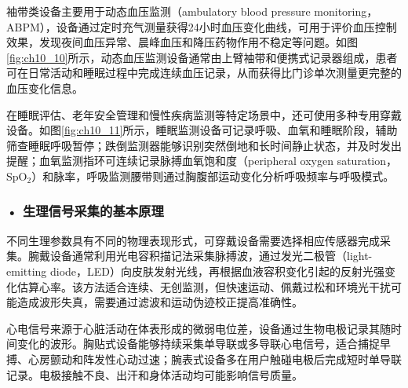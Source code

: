 袖带类设备主要用于动态血压监测（ambulatory blood pressure monitoring，ABPM），设备通过定时充气测量获得24小时血压变化曲线，可用于评价血压控制效果，发现夜间血压异常、晨峰血压和降压药物作用不稳定等问题。如图\ref{fig:ch10_10}所示，动态血压监测设备通常由上臂袖带和便携式记录器组成，患者可在日常活动和睡眠过程中完成连续血压记录，从而获得比门诊单次测量更完整的血压变化信息。
\par\medskip
\begin{center}
\begin{minipage}{0.82\textwidth}
\centering
{}
\label{fig:ch10_10}
\end{minipage}
\end{center}
\par\medskip

在睡眠评估、老年安全管理和慢性疾病监测等特定场景中，还可使用多种专用穿戴设备。如图\ref{fig:ch10_11}所示，睡眠监测设备可记录呼吸、血氧和睡眠阶段，辅助筛查睡眠呼吸暂停；跌倒监测器能够识别突然倒地和长时间静止状态，并及时发出提醒；血氧监测指环可连续记录脉搏血氧饱和度（peripheral oxygen saturation，SpO$_2$）和脉率，呼吸监测腰带则通过胸腹部运动变化分析呼吸频率与呼吸模式。

\par
\noindent\begin{minipage}{\textwidth}
\centering
{}
\label{fig:ch10_11}
\end{minipage}
\par


\subsubsection*{\textbf{• 生理信号采集的基本原理}}

不同生理参数具有不同的物理表现形式，可穿戴设备需要选择相应传感器完成采集。腕戴设备通常利用光电容积描记法采集脉搏波，通过发光二极管（light-emitting diode，LED）向皮肤发射光线，再根据血液容积变化引起的反射光强变化估算心率。该方法适合连续、无创监测，但快速运动、佩戴过松和环境光干扰可能造成波形失真，需要通过滤波和运动伪迹校正提高准确性。

心电信号来源于心脏活动在体表形成的微弱电位差，设备通过生物电极记录其随时间变化的波形。胸贴式设备能够持续采集单导联或多导联心电信号，适合捕捉早搏、心房颤动和阵发性心动过速；腕表式设备多在用户触碰电极后完成短时单导联记录。电极接触不良、出汗和身体活动均可能影响信号质量。

